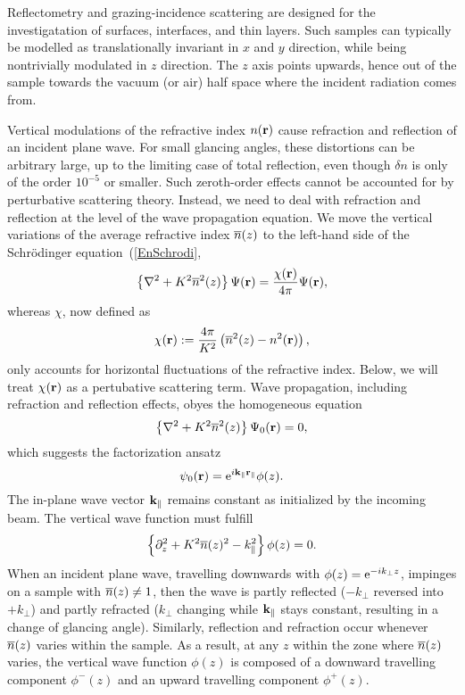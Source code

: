 Reflectometry and grazing-incidence scattering
are designed for the investigatation of surfaces, interfaces, and thin layers.
Such samples can typically be modelled as translationally invariant
in $x$ and $y$ direction,
while being nontrivially modulated in $z$ direction.
The $z$ axis points upwards, hence out of the sample towards the
vacuum (or air) half space where the incident radiation comes from.

Vertical modulations of the refractive index $n(\mathbf{r})$
cause refraction and reflection of an incident plane wave.
For small glancing angles,
these distortions can be arbitrary large,
up to the limiting case of total reflection,
even though $\delta n$ is only of the order $10^{-5}$ or smaller.
Such zeroth-order effects cannot be accounted for
by perturbative scattering theory.
Instead, we need to deal with refraction and reflection
at the level of the wave propagation equation.
We move the vertical variations of the average refractive index $\overline{n}(z)$
to the left-hand side of the Schrödinger equation~(\ref{EnSchrodi},
\begin{equation}\label{EHelmholtzGraded}
  \left\{\mathbf{\nabla}^2+K^2\overline{n}^2(z)\right\}\Psi(\mathbf{r})
  = \frac{\chi(\mathbf{r})}{4\pi}\Psi(\mathbf{r}),
\end{equation}
whereas $\chi$, now defined as
\begin{equation}\label{EChiGraded}
  \chi(\mathbf{r}) := \frac{4\pi}{K^2}\left(\overline{n}^2(z)-n^2(\mathbf{r})\right),
\end{equation}
only accounts for horizontal fluctuations of the refractive index.
Below, we will treat $\chi(\mathbf{r})$ as a pertubative scattering term.
Wave propagation, including refraction and reflection effects,
obyes the homogeneous equation
\begin{equation}\label{EHelmholtzGradedHomog}
  \left\{\mathbf{\nabla}^2+K^2\overline{n}^2(z)\right\}\Psi_0(\mathbf{r}) = 0,
\end{equation}
which suggests the factorization ansatz
\begin{equation}\label{Ewave3}
\psi_0(\mathbf{r}) = {\rm e}^{i \mathbf{k}_\parallel\mathbf{r}_\parallel} \phi(z).
\end{equation}
The in-plane wave vector $\mathbf{k}_\parallel$ remains constant
as initialized by the incoming beam.
The vertical wave function must fulfill
\begin{equation}\label{Ewavez}
\left\{\partial_z^2 + K^2\overline{n}(z)^2 - k_\parallel^2 \right\} \phi(z) = 0.
\end{equation}
When an incident plane wave,
travelling downwards with
$\phi(z)={\rm e}^{-ik_\perp z}$,
impinges on a sample with $\overline{n}(z)\ne 1$,
then the wave is partly reflected ($-k_\perp$ reversed into $+k_\perp$)
and partly refracted
($k_\perp$ changing while $\mathbf{k}_\parallel$ stays constant,
resulting in a change of glancing angle).
Similarly, reflection and refraction occur
whenever $\overline{n}(z)$ varies within the sample.
As a result, at any $z$ within the zone where $\overline{n}(z)$ varies,
the vertical wave function $\phi(z)$ is composed of a
downward travelling component $\phi^-(z)$
and an upward travelling component $\phi^+(z)$.

